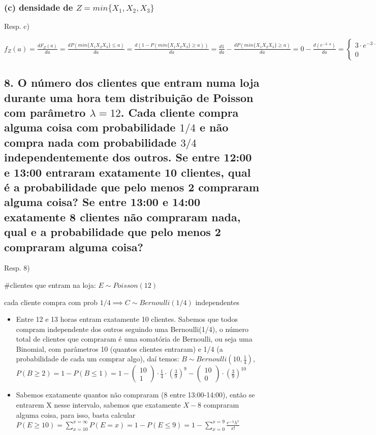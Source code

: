 \documentclass[english]{article}
\begin{document}
\subsubsection*{\textmd{(c) densidade de $Z=min\{X_{1},X_{2},X_{3}\}$}}

Resp. c)

$f_{Z}(a)=\frac{dF_{Z}(a)}{da}=\frac{dP(min\{X_{1}X_{2}X_{3}\}\leq a)}{da}=\frac{d(1-P(min\{X_{1}X_{2}X_{3}\}\geq a))}{da}=\frac{d1}{da}-\frac{dP(min\{X_{1}X_{2}X_{3}\}\geq a)}{da}=0-\frac{d(e^{-3\cdot a})}{da}=\begin{cases}
3\cdot e^{-3\cdot a} & se\, a\geq0\\
0 & caso\, contr\acute{a}rio
\end{cases}$


\subsection*{\textmd{8. O número dos clientes que entram numa loja durante uma
hora tem distribuição de Poisson com parâmetro $\lambda=12$. Cada
cliente compra alguma coisa com probabilidade $1/4$ e não compra
nada com probabilidade $3/4$ independentemente dos outros. Se entre
12:00 e 13:00 entraram exatamente 10 clientes, qual é a probabilidade
que pelo menos 2 compraram alguma coisa? Se entre 13:00 e 14:00 exatamente
8 clientes não compraram nada, qual e a probabilidade que pelo menos
2 compraram alguma coisa?}}

Resp. 8)

\#clientes que entram na loja: $E\sim Poisson(12)$

cada cliente compra com prob $1/4\implies C\sim Bernoulli(1/4)$ independentes
\begin{itemize}
\item Entre 12 e 13 horas entram exatamente 10 clientes. Sabemos que todos
compram independente dos outros seguindo uma Bernoulli(1/4), o número
total de clientes que compraram é uma somatória de Bernoulli, ou seja
uma Binomial, com parâmetros 10 (quantos clientes entraram) e 1/4
(a probabilidade de cada um comprar algo), daí temos: $B\sim Bernoulli(10,\frac{1}{4})$,
$P(B\geq2)=1-P(B\leq1)=1-(\begin{array}{c}
10\\
1
\end{array})\cdot\frac{1}{4}\cdot(\frac{3}{9})^{9}-(\begin{array}{c}
10\\
0
\end{array})\cdot(\frac{3}{9})^{10}$
\item Sabemos exatamente quantos não compraram (8 entre 13:00-14:00), então
se entrarem X nesse intervalo, sabemos que exatamente $X-8$ compraram
alguma coisa, para isso, basta calcular $P(E\geq10)=\sum_{x=10}^{x=\infty}P(E=x)=1-P(E\leq9)=1-\sum_{x=0}^{x=9}\frac{e^{-\lambda}\lambda^{x}}{x!}$
\end{itemize}
\end{document}
